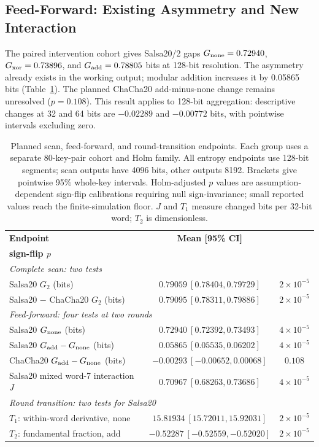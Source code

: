 \documentclass[electronics,article,submit,pdftex,oneauthor]{Definitions/mdpi}
\begin{document}


\subsection{Feed-Forward: Existing Asymmetry and New Interaction}\label{sec:ffresults}

The paired intervention cohort gives Salsa20/2 gaps $G_{\rm none}=0.72940$, $G_{\rm xor}=0.73896$, and $G_{\rm add}=0.78805$ bits at 128-bit resolution. The asymmetry already exists in the working output; modular addition increases it by 0.05865 bits (Table~\ref{tab:primary}). The planned ChaCha20 add-minus-none change remains unresolved ($p=0.108$). This result applies to 128-bit aggregation: descriptive changes at 32 and 64 bits are $-0.02289$ and $-0.00772$ bits, with pointwise intervals excluding zero.

\begin{table}[t]
\caption{Planned scan, feed-forward, and round-transition endpoints. Each group uses a separate 80-key-pair cohort and Holm family. All entropy endpoints use 128-bit segments; scan outputs have 4096 bits, other outputs 8192. Brackets give pointwise 95\% whole-key intervals. Holm-adjusted $p$ values are assumption-dependent sign-flip calibrations requiring null sign-invariance; small reported values reach the finite-simulation floor. $J$ and $T_1$ measure changed bits per 32-bit word; $T_2$ is dimensionless.\label{tab:primary}}
\small\setlength{\tabcolsep}{3pt}
\begin{tabularx}{\textwidth}{Xcc}
\toprule
\textbf{Endpoint} & \textbf{Mean [95\% CI]} & \shortstack{\textbf{Holm-adjusted}\\\textbf{sign-flip $p$}}\\
\midrule
\multicolumn{3}{l}{\emph{Complete scan: two tests}}\\
Salsa20 $G_2$ (bits) & $0.79059\ [0.78404,0.79729]$ & $2\times10^{-5}$\\
Salsa20 $-$ ChaCha20 $G_2$ (bits) & $0.79095\ [0.78311,0.79886]$ & $2\times10^{-5}$\\
\midrule
\multicolumn{3}{l}{\emph{Feed-forward: four tests at two rounds}}\\
Salsa20 $G_{\rm none}$ (bits) & $0.72940\ [0.72392,0.73493]$ & $4\times10^{-5}$\\
Salsa20 $G_{\rm add}-G_{\rm none}$ (bits) & $0.05865\ [0.05535,0.06202]$ & $4\times10^{-5}$\\
ChaCha20 $G_{\rm add}-G_{\rm none}$ (bits) & $-0.00293\ [-0.00652,0.00068]$ & $0.108$\\
Salsa20 mixed word-7 interaction $J$ & $0.70967\ [0.68263,0.73686]$ & $4\times10^{-5}$\\
\midrule
\multicolumn{3}{l}{\emph{Round transition: two tests for Salsa20}}\\
$T_1$: within-word derivative, none & $15.81934\ [15.72011,15.92031]$ & $2\times10^{-5}$\\
$T_2$: fundamental fraction, add & $-0.52287\ [-0.52559,-0.52020]$ & $2\times10^{-5}$\\
\bottomrule
\end{tabularx}
\end{table}
\end{document}
